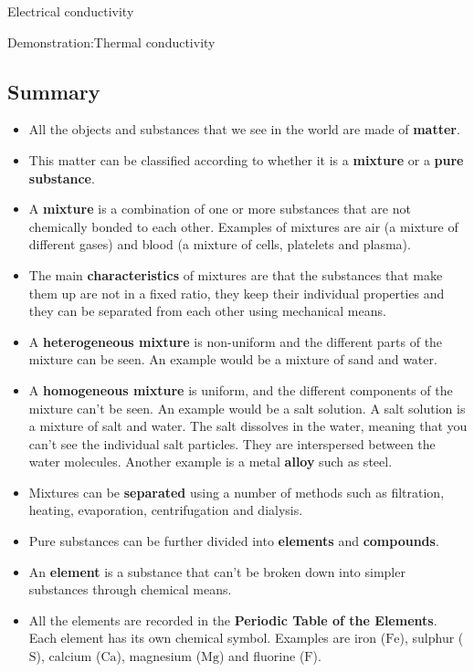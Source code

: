\begin{iexperiment}{Electrical conductivity}
\begin{gexperiment}{Demonstration:Thermal conductivity}
            \subsection{ Summary}
            \nopagebreak
      \label{m38706*id67458}\begin{itemize}[noitemsep]
            \label{m38706*uid114}\item All the objects and substances that we see in the world are made of \textbf{matter}.
\label{m38706*uid115}\item This matter can be classified according to whether it is a \textbf{mixture} or a \textbf{pure substance}.
\label{m38706*uid116}\item A \textbf{mixture} is a combination of one or more substances that are not chemically bonded to each other. Examples of mixtures are air (a mixture of different gases) and blood (a mixture of cells, platelets and plasma).
\label{m38706*uid117}\item The main \textbf{characteristics} of mixtures are that the substances that make them up are not in a fixed ratio, they keep their individual properties and they can be separated from each other using mechanical means.
\label{m38706*uid118}\item A \textbf{heterogeneous mixture} is non-uniform and the different parts of the mixture can be seen. An example would be a mixture of sand and water.
\label{m38706*uid119}\item A \textbf{homogeneous mixture} is uniform, and the different components of the mixture can't be seen. An example would be a salt solution. A salt solution is a mixture of salt and water. The salt dissolves in the water, meaning that you can't see the individual salt particles. They are interspersed between the water molecules. Another example is a metal \textbf{alloy} such as steel.
\label{m38706*uid120}\item Mixtures can be \textbf{separated} using a number of methods such as filtration, heating, evaporation, centrifugation and dialysis.
\label{m38706*uid121}\item Pure substances can be further divided into \textbf{elements} and \textbf{compounds}.
\label{m38706*uid122}\item An \textbf{element} is a substance that can't be broken down into simpler substances through chemical means.
\label{m38706*uid123}\item All the elements are recorded in the \textbf{Periodic Table of the Elements}. Each element has its own chemical symbol. Examples are iron ($\mathrm{Fe}$), sulphur ($\mathrm{S}$), calcium ($\mathrm{Ca}$), magnesium ($\mathrm{Mg}$) and fluorine ($\mathrm{F}$).

\end{itemize}
\end{gexperiment}
\end{iexperiment}
